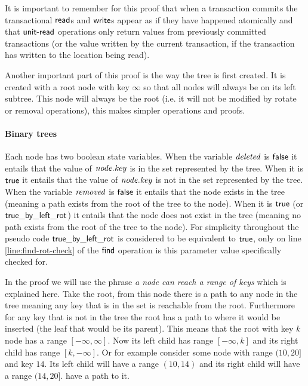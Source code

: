 It is important to remember for this proof that when a transaction commits the transactional $\lit{read}$s and $\lit{write}$s appear as if they have happened atomically
and that $\lit{unit-read}$ operations only return values from previously committed transactions (or the value written by the current transaction, if the transaction has written to the location being read).

Another important part of this proof is the way the tree is first created.
It is created with a root node with key $\infty$ so that all nodes will always be on its left subtree.
This node will always be the root (i.e. it will not be modified by rotate or removal operations), this makes simpler operations and proofs.


\paragraph{Binary trees}
Each node has two boolean state variables.
When the variable $\ms{deleted}$ is $\lit{false}$ it entails that the value of $\ms{node.key}$ is in the set represented by the tree.
When it is $\lit{true}$ it entails that the value of $\ms{node.key}$ is not in the set represented by the tree.
When the variable $\ms{removed}$ is $\lit{false}$ it entails that the node exists in the tree (meaning a path exists from the root of the tree to the node).
When it is $\lit{true}$ (or $\lit{true\_by\_left\_rot}$) it entails that the node does not exist in the tree (meaning no path exists from the root of the tree to the node).
For simplicity throughout the pseudo code $\lit{true\_by\_left\_rot}$ is considered to be equivalent to $\lit{true}$, only on line \ref{line:find-rot-check} of the $\lit{find}$ operation is this
parameter value specifically checked for.

In the proof we will use the phrase \emph{a node can reach a range of keys} which is explained here.
Take the root, from this node there is a path to any node in the tree meaning any key that is in the set is reachable from the root.
Furthermore for any key that is not in the tree the root has a path to where it would be inserted (the leaf that would be its parent).
This means that the root with key $k$ node has a range $[-\infty, \infty]$.
Now its left child has range $[-\infty,k]$ and its right child has range $[k,-\infty]$.
Or for example consider some node with range $(10, 20]$ and key $14$.
Its left child will have a range $(10, 14)$ and its right child will have a range $(14, 20]$. have a path to it.

